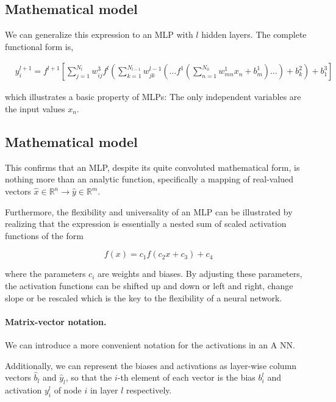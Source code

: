 \documentclass[%
oneside,                 %
final,                   %
10pt]{article}
\begin{document}
\subsection{Mathematical model}

We can generalize this expression to an MLP with $l$ hidden
layers. The complete functional form is,

\begin{align}
&y^{l+1}_i = f^{l+1}\left[\!\sum_{j=1}^{N_l} w_{ij}^3 f^l\left(\sum_{k=1}^{N_{l-1}}w_{jk}^{l-1}\left(\dots f^1\left(\sum_{n=1}^{N_0} w_{mn}^1 x_n+ b_m^1\right)\dots\right)+b_k^2\right)+b_1^3\right] &&
 \label{completeNN}
\end{align}

which illustrates a basic property of MLPs: The only independent
variables are the input values $x_n$.

\subsection{Mathematical model}

This confirms that an MLP, despite its quite convoluted mathematical
form, is nothing more than an analytic function, specifically a
mapping of real-valued vectors $\hat{x} \in \mathbb{R}^n \rightarrow
\hat{y} \in \mathbb{R}^m$.

Furthermore, the flexibility and universality of an MLP can be
illustrated by realizing that the expression is essentially a nested
sum of scaled activation functions of the form

\begin{equation}
 f(x) = c_1 f(c_2 x + c_3) + c_4
\end{equation}

where the parameters $c_i$ are weights and biases. By adjusting these
parameters, the activation functions can be shifted up and down or
left and right, change slope or be rescaled which is the key to the
flexibility of a neural network.

\paragraph{Matrix-vector notation.}
We can introduce a more convenient notation for the activations in an A NN. 

Additionally, we can represent the biases and activations
as layer-wise column vectors $\hat{b}_l$ and $\hat{y}_l$, so that the $i$-th element of each vector 
is the bias $b_i^l$ and activation $y_i^l$ of node $i$ in layer $l$ respectively. 
\end{document}
